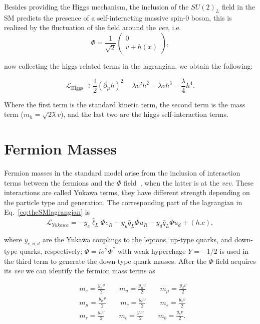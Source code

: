 Besides providing the Higgs mechanism, the inclusion of the
$SU(2)_{L}$ field in the SM predicts the presence of a
self-interacting massive spin-0
boson, this is realized by the fluctuation of the field around the
\textit{vev}, i.e.
\begin{equation}
\Phi = \frac{1}{\sqrt{2}}\begin{pmatrix} 0\\
  v + h(x)\end{pmatrix},
\end{equation}
 
now collecting the higgs-related terms in the lagrangian, we obtain
the following:

\begin{equation}
\mathcal{L}_{\mathrm{Higgs}} \supset
\frac{1}{2}\left(\partial_{\mu}h\right)^{2} -\lambda v^{2}h^{2} -
\lambda vh^{3} - \frac{\lambda}{4}h^{4}.
\end{equation}

Where the first term is the standard kinetic term, the second term is
the mass term ($m_{h} = \sqrt{2\lambda}v$), and the last two are the higgs self-interaction terms. 
\section{Fermion Masses}\label{yukawa}
Fermion masses in the standard model arise from the inclusion of
interaction terms between the fermions and the $\Phi$ field~\cite{WeinbergLeptons}, when
the latter is at the \textit{vev}. These interactions are called
Yukawa terms, they have different strength depending on the particle
type and generation. The corresponding part of the lagrangian in
Eq.~\ref{eq:theSMlagrangian} is
\begin{equation}
\label{eq:yukawa}
\mathcal{L}_{Yukawa} = -y_{e}\bar{\ell}_{L}\Phi e_{R} - y_{u}\bar{q}_{L}\Phi u_{R}  -
y_{d}\bar{q}_{L}\tilde{\Phi} u_{d} + (h.c),
\end{equation}

where $y_{e,u,d}$ are the Yukawa couplings to the leptons, up-type
quarks, and down-type quarks, respectively; $\tilde{\Phi} =
i\sigma^{2}\Phi^{*}$ with weak hyperchage $Y = -1/2$ is used in the
third term to generate the down-type quark masses. After the $\Phi$
field acquires its \textit{vev} we can identify the fermion mass terms
as

\begin{equation}
 \begin{aligned}
       &m_{e} = \frac{y_{e}v}{2}  \qquad m_{u} = \frac{y_{u}v}{2}  \qquad  m_{\mu} = \frac{y_{d}v}{2} \\
       &m_{\mu} = \frac{y_{\mu}v}{2}  \qquad m_{c} = \frac{y_{c}v}{2}
       \qquad  m_{s} = \frac{y_{s}v}{2} \\
       &
       m_{\tau} = \frac{y_{\tau}v}{2}  \qquad m_{t} = \frac{y_{t}v}{2}  \qquad  m_{b} = \frac{y_{b}v}{2}.
       \end{aligned}
\label{eq:BosonMasses}
\end{equation}

